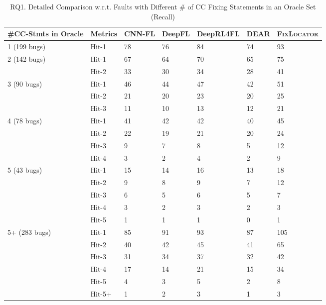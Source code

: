 \begin{table}[t]
	\caption{RQ1. Detailed Comparison w.r.t. Faults with Different \# of CC Fixing Statements in an Oracle Set (Recall)}
	\vspace{-10pt}
        \tabcolsep 2pt
	{\small
		\begin{center}
			\renewcommand{\arraystretch}{1}
			\begin{tabular}{p{1.5cm}<{\centering}|p{0.8cm}<{\centering}|p{1cm}<{\centering}|p{0.8cm}<{\centering}|p{1.3cm}<{\centering}|p{0.9cm}<{\centering}|p{1.1cm}<{\centering}}
				\hline
				\#CC-Stmts in Oracle & Metrics & CNN-FL & DeepFL & DeepRL4FL & DEAR & {\textsc{Fix\-Locator}\xspace} \\
				\hline
				\multirow{1}{*}{1 (199 bugs)}   & Hit-1  & 78 & 76 & 84 & 74& 93 \\
				\hline
				\multirow{2}{*}{2 (142 bugs)}  & Hit-1   & 67 & 64 & 70 &65 & 75 \\
				& Hit-2         & 33 & 30 & 34 &28 & 41 \\
				\hline
				\multirow{3}{*}{3 (90 bugs)}  & Hit-1    & 46 & 44 & 47 &42 & 51 \\
				& Hit-2     & 21 & 20 & 23 & 20& 25\\
				& Hit-3     & 11 &10 & 13 &12 & 21 \\
				\hline
				\multirow{4}{*}{4 (78 bugs)}  & Hit-1    & 41 & 42 & 42 &40 & 45 \\
				& Hit-2     &22 & 19 & 21 &20 & 24 \\
				& Hit-3     & 9 & 7 & 8 &5 & 12 \\
				& Hit-4     & 3 & 2 & 4 &2 & 9 \\
				\hline
				\multirow{5}{*}{5 (43 bugs)}  & Hit-1    & 15 & 14 & 16 &13 & 18 \\
				& Hit-2     & 9 & 8 & 9 &7 & 12 \\
				& Hit-3     & 6 & 5 & 6 &5 & 7 \\
				& Hit-4     & 3 & 2 & 3 & 2& 3 \\
				& Hit-5     & 1 & 1 & 1 &0 & 1 \\
				\hline
				\multirow{6}{*}{5+ (283 bugs)}  & Hit-1 & 85 & 91 & 93 & 87 & 105 \\
				& Hit-2     & 40 & 42 & 45 & 41& 65 \\
				& Hit-3     & 31 & 34 & 37 & 32& 42 \\
				& Hit-4     & 17 & 14 & 21 & 15& 34 \\
				& Hit-5     & 4 & 3 & 5 & 2& 8 \\
				& Hit-5+    & 1 & 2 & 3 & 1& 3 \\
				\hline
			\end{tabular}
			

\end{center}}
\end{table}
